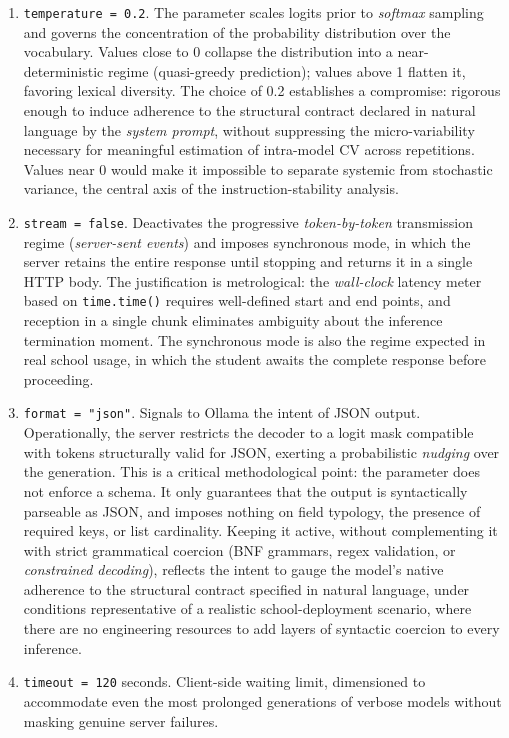 \documentclass{sbc2023}%
\begin{document}
\begin{enumerate}
\item \texttt{temperature = 0.2}. The parameter scales logits prior to \textit{softmax} sampling and governs the concentration of the probability distribution over the vocabulary. Values close to 0 collapse the distribution into a near-deterministic regime (quasi-greedy prediction); values above 1 flatten it, favoring lexical diversity. The choice of 0.2 establishes a compromise: rigorous enough to induce adherence to the structural contract declared in natural language by the \textit{system prompt}, without suppressing the micro-variability necessary for meaningful estimation of intra-model CV across repetitions. Values near 0 would make it impossible to separate systemic from stochastic variance, the central axis of the instruction-stability analysis.
\item \texttt{stream = false}. Deactivates the progressive \textit{token-by-token} transmission regime (\textit{server-sent events}) and imposes synchronous mode, in which the server retains the entire response until stopping and returns it in a single HTTP body. The justification is metrological: the \textit{wall-clock} latency meter based on \texttt{time.time()} requires well-defined start and end points, and reception in a single chunk eliminates ambiguity about the inference termination moment. The synchronous mode is also the regime expected in real school usage, in which the student awaits the complete response before proceeding.
\item \texttt{format = "json"}. Signals to Ollama the intent of JSON output. Operationally, the server restricts the decoder to a logit mask compatible with tokens structurally valid for JSON, exerting a probabilistic \textit{nudging} over the generation. This is a critical methodological point: the parameter does not enforce a schema. It only guarantees that the output is syntactically parseable as JSON, and imposes nothing on field typology, the presence of required keys, or list cardinality. Keeping it active, without complementing it with strict grammatical coercion (BNF grammars, regex validation, or \textit{constrained decoding}), reflects the intent to gauge the model's native adherence to the structural contract specified in natural language, under conditions representative of a realistic school-deployment scenario, where there are no engineering resources to add layers of syntactic coercion to every inference.
\item \texttt{timeout = 120} seconds. Client-side waiting limit, dimensioned to accommodate even the most prolonged generations of verbose models without masking genuine server failures.
\end{enumerate}
\end{document}
